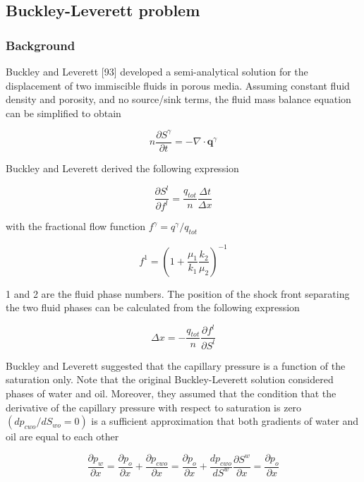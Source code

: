 \subsection{Buckley-Leverett problem}
\subsubsection*{Background}
Buckley and Leverett [93] developed a semi-analytical solution for the displacement of two immiscible fluids in porous media. Assuming constant fluid density and porosity, and no source/sink terms, the fluid mass balance equation can be
simplified to obtain

\begin{equation}
n \frac{\partial S^\gamma }{\partial t} = - \nabla \cdot
\mathbf{q}^\gamma
\end{equation}

Buckley and Leverett derived the following expression

\begin{equation}
\frac{\partial S^l}{\partial f^l} = \frac{q_{tot}}{n} \frac{\Delta
t}{\Delta x}
\end{equation}

with the fractional flow function $f^\gamma = q^\gamma/q_{tot}$

\begin{equation}
f^1 = \left( 1 + \frac{\mu_1}{k_1} \frac{k_2}{\mu_2} \right)^{-1}
\end{equation}

1 and 2 are the fluid phase numbers. The position of the shock front separating the two fluid phases can be calculated from the following expression

\begin{equation}
\Delta x = - \frac{q_{tot}}{n} \frac{\partial f^l}{\partial S^l}
\end{equation}

Buckley and Leverett suggested that the capillary pressure is a function of the saturation only. Note that the original Buckley-Leverett solution considered phases of water and oil. Moreover, they assumed that the condition that the derivative of the capillary pressure with respect to saturation is zero $(dp_{cwo}/dS_{wo}= 0)$ is a sufficient approximation that both
gradients of water and oil are equal to each other

\begin{equation}
\frac{\partial p_w }{\partial x} = \frac{\partial p_o}{\partial x}
+ \frac{\partial p_{cwo}}{\partial x} = \frac{\partial p_o
}{\partial x} + \frac{dp_{cwo}}{dS^w }\frac{\partial S^w}{\partial
x} = \frac{\partial p_o}{\partial x}
\end{equation}

